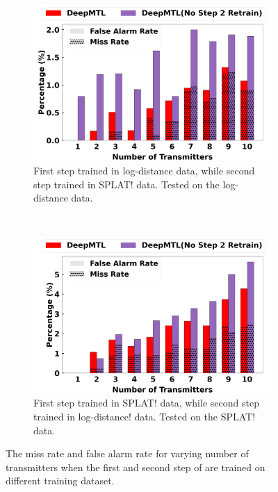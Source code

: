 \begin{figure}[t!]
    \centering
    \begin{subfigure}[t]{0.48\textwidth}
        \centering
        \includegraphics[width=\textwidth]{chapters/wowmom-pmc/figures/noretrain-logdistance-missfalse-vary_numintru.png}
        \caption{First step trained in log-distance data, while second step trained in SPLAT! data. Tested on the log-distance data.}
        \label{fig:notrain-logdist-missfalse}
    \end{subfigure}%
    ~ 
    \begin{subfigure}[t]{0.48\textwidth}
        \centering
        \includegraphics[width=\textwidth]{chapters/wowmom-pmc/figures/noretrain-splat-missfalse-vary_numintru.png}
        \caption{First step trained in SPLAT! data, while second step trained in log-distance! data. Tested on the SPLAT! data.}
        \label{fig:notrain-splat-missfalse}
    \end{subfigure}
    \caption{The miss rate and false alarm rate for varying number of transmitters when the first and second step of \our are trained on different training dataset.}
    \label{fig:notrain-missfalse}
\end{figure}

